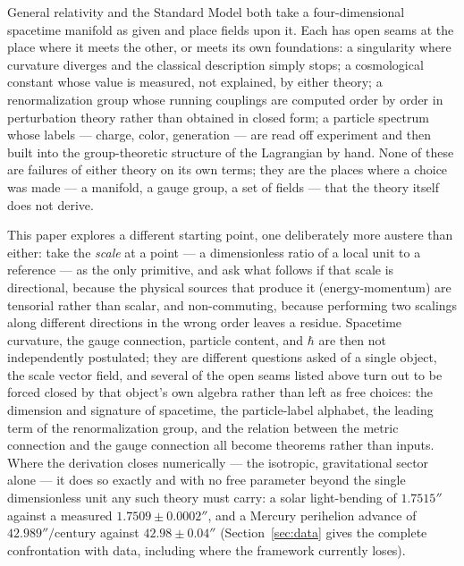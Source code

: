 \documentclass[pdflatex,sn-mathphys-num]{sn-jnl}
\theoremstyle{thmstyleone}
\theoremstyle{thmstylethree}
\theoremstyle{thmstyletwo}
\begin{document}
General relativity and the Standard Model both take a four-dimensional
spacetime manifold as given and place fields upon it. Each has open
seams at the place where it meets the other, or meets its own
foundations: a singularity where curvature diverges and the classical
description simply stops; a cosmological constant whose value is
measured, not explained, by either theory; a renormalization group
whose running couplings are computed order by order in perturbation
theory rather than obtained in closed form; a particle spectrum whose
labels — charge, color, generation — are read off experiment and then
built into the group-theoretic structure of the Lagrangian by hand. None
of these are failures of either theory on its own terms; they are the
places where a choice was made — a manifold, a gauge group, a set of
fields — that the theory itself does not derive.

This paper explores a different starting point, one deliberately more
austere than either: take the \emph{scale} at a point — a dimensionless
ratio of a local unit to a reference — as the only primitive, and ask
what follows if that scale is directional, because the physical sources
that produce it (energy-momentum) are tensorial rather than scalar, and
non-commuting, because performing two scalings along different
directions in the wrong order leaves a residue. Spacetime curvature, the
gauge connection, particle content, and $\hbar$ are then not
independently postulated; they are different questions asked of a single
object, the scale vector field, and several of the open seams listed
above turn out to be forced closed by that object's own algebra rather
than left as free choices: the dimension and signature of spacetime, the
particle-label alphabet, the leading term of the renormalization group,
and the relation between the metric connection and the gauge connection
all become theorems rather than inputs. Where the derivation closes
numerically — the isotropic, gravitational sector alone — it does so
exactly and with no free parameter beyond the single dimensionless unit
any such theory must carry: a solar light-bending of $1.7515''$ against a
measured $1.7509\pm0.0002''$, and a Mercury perihelion advance of
$42.989''/\mathrm{century}$ against $42.98\pm0.04''$
(Section~\ref{sec:data} gives the complete confrontation with data,
including where the framework currently loses).
\end{document}
